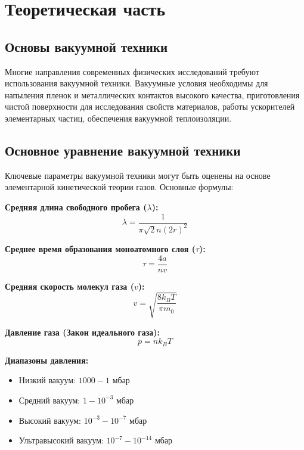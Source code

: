 \documentclass[12pt,oneside,a4paper]{article}
\begin{document}
\section{Теоретическая часть}

\subsection{Основы вакуумной техники}
Многие направления современных физических исследований требуют использования вакуумной техники. Вакуумные условия необходимы для напыления пленок и металлических контактов высокого качества, приготовления чистой поверхности для исследования свойств материалов, работы ускорителей элементарных частиц, обеспечения вакуумной теплоизоляции.

\subsection{Основное уравнение вакуумной техники}
Ключевые параметры вакуумной техники могут быть оценены на основе элементарной кинетической теории газов. Основные формулы:

\textbf{Средняя длина свободного пробега (\( \lambda \)):}
\begin{equation}
    \lambda = \frac{1}{\pi \sqrt{2}n(2r)^2}
\end{equation}

\textbf{Среднее время образования моноатомного слоя (\( \tau \)):}
\begin{equation}
    \tau = \frac{4a}{nv}
\end{equation}


\textbf{Средняя скорость молекул газа (\( v \)):}
\begin{equation}
    v = \sqrt{\frac{8k_BT}{\pi m_0}}
\end{equation}

\textbf{Давление газа (Закон идеального газа):}
\begin{equation}
    p = nk_BT %
\end{equation}

\textbf{Диапазоны давления:}
\begin{itemize}
    \item Низкий вакуум: $1000 - 1$ мбар
    \item Средний вакуум: $1 - 10^{-3}$ мбар
    \item Высокий вакуум: $10^{-3} - 10^{-7}$ мбар
    \item Ультравысокий вакуум: $10^{-7} - 10^{-14}$ мбар
\end{itemize}
\end{document}
